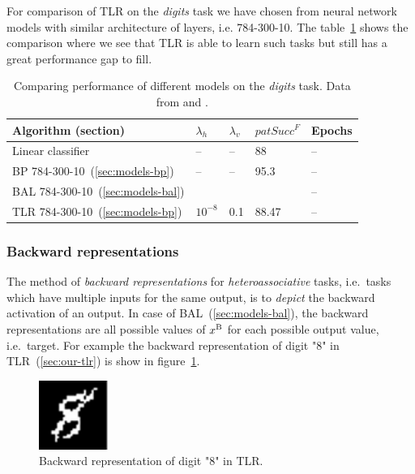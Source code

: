 For comparison of TLR on the \emph{digits} task we have chosen from \citet{digits2014mnist} neural network models with similar architecture of layers, i.e. 784-300-10. The table~\ref{tab:results-cmp-digits} shows the comparison where we see that TLR is able to learn such tasks but still has a great performance gap to fill. 

\begin{table}[H] 
  \centering
    \begin{tabular}{|l|l|l|l|l|}
    \hline
    Algorithm (section)&$\lambda_h$&$\lambda_v$&$patSucc^F$ &Epochs\\ %
    \hline
    Linear classifier & -- & -- & 88 & -- \\ 
    \hline
    BP 784-300-10~(\ref{sec:models-bp})& -- & -- & 95.3 & -- \\ 
    \hline 
    BAL 784-300-10~(\ref{sec:models-bal})& & & & -- \\
    \hline 
    TLR 784-300-10~(\ref{sec:models-bp})& $10^{-8}$ & 0.1 & 88.47 & -- \\
    \hline 
    \end{tabular}
  \caption{Comparing performance of different models on the \emph{digits} task. Data from \citet{lecun1998gradient} and \citet{digits2014mnist}.} 
  \label{tab:results-cmp-digits}
\end{table}

\subsubsection{Backward representations} 
\label{sec:our-backward-repre}

The method of \emph{backward representations} for \emph{heteroassociative} tasks, i.e.~tasks which have multiple inputs for the same output, is to \emph{depict} the backward activation of an output. In case of BAL~(\ref{sec:models-bal}), the backward representations are all possible values of $x^{\rm B}$ for each possible output value, i.e.~target. For example the backward representation of digit "8" in TLR~(\ref{sec:our-tlr}) is show in figure~\ref{fig:our-backward-repre-8}. 

\begin{figure}[H]
  \centering
  \includegraphics[width=0.2\textwidth]{img/tlr-digit-8.png} 
  \caption{Backward representation of digit "8" in TLR.}
  \label{fig:our-backward-repre-8}
\end{figure}

